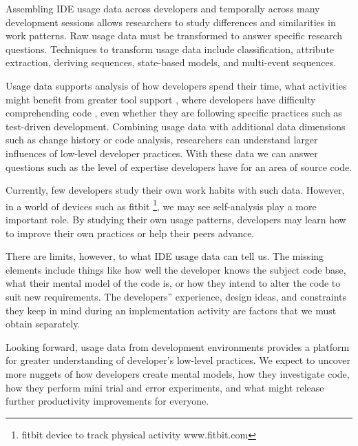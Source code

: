 \documentclass{book}
\begin{document}
Assembling IDE usage data across developers and temporally across many development sessions allows researchers to study differences and similarities in work patterns.   Raw usage data must be transformed to answer specific research questions.  Techniques to transform usage data include classification, attribute extraction, deriving sequences, state-based models, and  multi-event sequences.  

Usage data supports analysis of how developers spend their time\cite{V:johnson2003beyond}, what activities might benefit from greater tool support \cite{V:MurphyHill2012How}, where developers have difficulty comprehending code \cite{Carter2010Are}, even whether they are following specific practices such as test-driven development\cite{Kou2010Operational}.  Combining usage data with additional data dimensions such as change history or code analysis, researchers can understand larger influences of low-level developer practices.  With these data we can answer questions such as the level of expertise developers have for an area of source code. \cite{Fritz2010Degreeofknowledge}

Currently, few developers study their own work habits with such data.  However, in a world of devices such as fitbit \footnote{fitbit device to track physical activity www.fitbit.com}, we may see self-analysis play a more important role.  By studying their own usage patterns, developers may learn how to improve their own practices or help their peers advance.

There are limits, however, to what IDE usage data can tell us.  The missing elements include things like how well the developer knows the subject code base, what their mental model of the code is, or how they intend to alter the code to suit new requirements.  The developers'' experience, design ideas, and constraints they keep in mind during an implementation activity are factors that we must obtain separately.  

Looking forward, usage data from development environments provides a platform for greater understanding of developer's low-level practices.  We expect to uncover more nuggets of how developers create mental models, how they investigate code, how they perform mini trial and error experiments, and what might release further productivity improvements for everyone.









\end{document}
